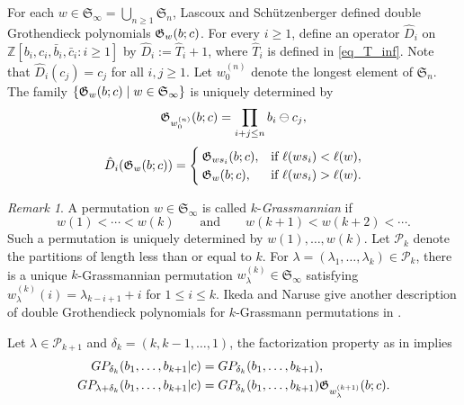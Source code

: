 \documentclass[a4paper]{amsart}
\theoremstyle{remark}
\newtheorem{remark}[thm]{Remark}
\numberwithin{equation}{section}
\begin{document}
For each \(w\in \mathfrak{S}_\infty=\bigcup_{n\geq 1}\mathfrak{S}_n\), Lascoux and Sch\"utzenberger \cite{LaSc} defined double Grothendieck polynomials \(\mathfrak{G}_w(b;c)\). For every \(i\geq 1\), define an operator $\hat{D}_i$ on $\mathbb Z[b_i,c_i,\bar{b}_i,\bar{c}_i:i\ge1]$ by \(\hat{D}_i:=\hat{T}_i+1\), where \(\hat{T}_i\) is defined in \eqref{eq_T_inf}. Note that $\hat{D}_i(c_j)=c_j$ for all $i,j\geq 1$. Let $w_0^{(n)}$ denote the longest element of $\mathfrak{S}_n$. The family $ \{\mathfrak{G}_w(b;c)\mid w\in \mathfrak{S}_\infty\}$
is uniquely determined by
\[
\mathfrak{G}_{w_0^{(n)}}(b;c)
=\prod_{i+j\le n}
b_i\ominus c_j,
\]
\begin{equation}\label{eq_p_i_equi}
\hat{D}_i(\mathfrak{G}_w(b;c))=
\begin{cases}
\mathfrak{G}_{ws_i}(b;c), & \text{if } \ell(ws_i)<\ell(w),\\
\mathfrak{G}_w(b;c), & \text{if } \ell(ws_i)>\ell(w).
\end{cases}
\end{equation}




\begin{remark}
 A permutation \(w\in \mathfrak{S}_\infty\) is called \(k\)-\emph{Grassmannian} if
\[
w(1)<\cdots<w(k)
\qquad\text{and}\qquad
w(k+1)<w(k+2)<\cdots.
\]
Such a permutation is uniquely determined by \(w(1),\dots,w(k)\). Let $\mathscr{P}_k$ denote the partitions of length less than or equal to $k$. For \(\lambda=(\lambda_1,\dots,\lambda_k)\in\mathscr{P}_k\), there is a unique
\(k\)-Grassmannian permutation \(w_\lambda^{(k)}\in \mathfrak{S}_\infty\) satisfying $w_\lambda^{(k)}(i)=\lambda_{k-i+1}+i$ for $1\leq i\leq k$. Ikeda and Naruse give another description of double Grothendieck polynomials for $k$-Grassmann permutations in \cite[Section 2.4]{IN}.
\end{remark}


Let $\lambda \in \mathscr{P}_{k+1}$ and $\delta_k=(k,k-1,\dots,1)$, the factorization property as in \cite[Proposition 2.3]{IN} implies
\begin{align*}
GP_{\delta_{k}}(b_1,\ldots,b_{k+1}| c)
&=GP_{\delta_{k}}(b_1,\ldots,b_{k+1}),\\
GP_{\lambda+\delta_{k}}(b_1,\ldots,b_{k+1}| c)
&=GP_{\delta_{k}}(b_1,\ldots,b_{k+1})\mathfrak{G}_{w_\lambda^{(k+1)}}(b;c).
\end{align*}
\end{document}
